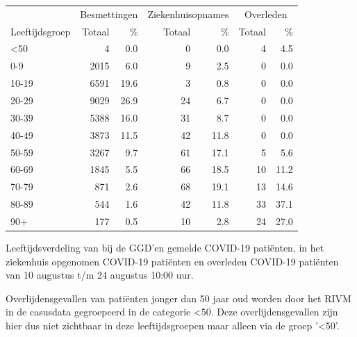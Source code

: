 \documentclass[
  english,
  man,floatsintext]{apa6}
\begin{document}
\begin{table}
\centering\begingroup\fontsize{11}{13}\selectfont

\begin{threeparttable}
\begin{tabular}{lrrrrrr}
\toprule
\multicolumn{1}{c}{ } & \multicolumn{2}{c}{Besmettingen} & \multicolumn{2}{c}{Ziekenhuisopnames} & \multicolumn{2}{c}{Overleden} \\
\cmidrule(l{3pt}r{3pt}){2-3} \cmidrule(l{3pt}r{3pt}){4-5} \cmidrule(l{3pt}r{3pt}){6-7}
Leeftijdsgroep & Totaal & \% & Totaal & \% & Totaal & \%\\
\midrule
<50 & 4 & 0.0 & 0 & 0.0 & 4 & 4.5\\
0-9 & 2015 & 6.0 & 9 & 2.5 & 0 & 0.0\\
10-19 & 6591 & 19.6 & 3 & 0.8 & 0 & 0.0\\
20-29 & 9029 & 26.9 & 24 & 6.7 & 0 & 0.0\\
30-39 & 5388 & 16.0 & 31 & 8.7 & 0 & 0.0\\
40-49 & 3873 & 11.5 & 42 & 11.8 & 0 & 0.0\\
50-59 & 3267 & 9.7 & 61 & 17.1 & 5 & 5.6\\
60-69 & 1845 & 5.5 & 66 & 18.5 & 10 & 11.2\\
70-79 & 871 & 2.6 & 68 & 19.1 & 13 & 14.6\\
80-89 & 544 & 1.6 & 42 & 11.8 & 33 & 37.1\\
90+ & 177 & 0.5 & 10 & 2.8 & 24 & 27.0\\
\bottomrule
\end{tabular}
\begin{tablenotes}
\item[1] Leeftijdsverdeling van bij de GGD’en gemelde COVID-19 patiënten, in het ziekenhuis opgenomen COVID-19 patiënten en overleden COVID-19 patiënten van 10 augustus t/m 24 augustus 10:00 uur.
\item[2] Overlijdensgevallen van patiënten jonger dan 50 jaar oud worden door het RIVM in de casusdata gegroepeerd in de categorie <50. Deze overlijdensgevallen zijn hier dus niet zichtbaar in deze leeftijdsgroepen maar alleen via de groep '<50'.
\end{tablenotes}
\end{threeparttable}
\endgroup{}
\end{table}

\newpage
\end{document}
